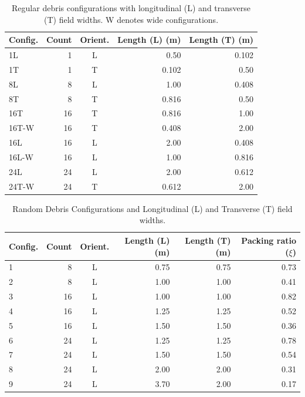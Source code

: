 \documentclass{article}
\begin{document}
{\begin{table}[h!]
\centering
\caption{Regular debris configurations with longitudinal (L) and transverse (T) field widths. W denotes wide configurations.}
\small
\begin{tabular}{l r c r r}
\hline
\textbf{Config.} & \textbf{Count} & \textbf{Orient.} & \textbf{Length (L) (m)} & \textbf{Length (T) (m)} \\
\hline
1L & 1  & L & 0.50 & 0.102 \\
1T & 1  & T & 0.102 & 0.50 \\
8L & 8  & L & 1.00 & 0.408 \\
8T & 8  & T & 0.816 & 0.50 \\
16T & 16 & T & 0.816 & 1.00 \\
16T-W & 16 & T & 0.408 & 2.00 \\
16L & 16 & L & 2.00 & 0.408 \\
16L-W & 16 & L & 1.00 & 0.816 \\
24L & 24 & L & 2.00 & 0.612 \\
24T-W & 24 & T & 0.612 & 2.00 \\
\hline
\end{tabular}
\label{tab:debris-configurations-compact}
\end{table}

\begin{table}[h!]
\centering
\caption{Random Debris Configurations and Longitudinal (L) and Transverse (T) field widths.}
\small
\begin{tabular}{l r c r r r}
\hline
\textbf{Config.} & \textbf{Count} & \textbf{Orient.} & \textbf{Length (L) (m)} & \textbf{Length (T) (m)} & \textbf{Packing ratio ($\xi$)} \\
\hline
1 & 8  & L & 0.75 & 0.75 & 0.73 \\
2 & 8  & L & 1.00 & 1.00 & 0.41 \\
3 & 16 & L & 1.00 & 1.00 & 0.82 \\
4 & 16 & L & 1.25 & 1.25 & 0.52 \\
5 & 16 & L & 1.50 & 1.50 & 0.36 \\
6 & 24 & L & 1.25 & 1.25 & 0.78 \\
7 & 24 & L & 1.50 & 1.50 & 0.54 \\
8 & 24 & L & 2.00 & 2.00 & 0.31 \\
9 & 24 & L & 3.70 & 2.00 & 0.17 \\
\hline
\end{tabular}
\label{tab:random-debris-compact}
\end{table}

}
\end{document}
